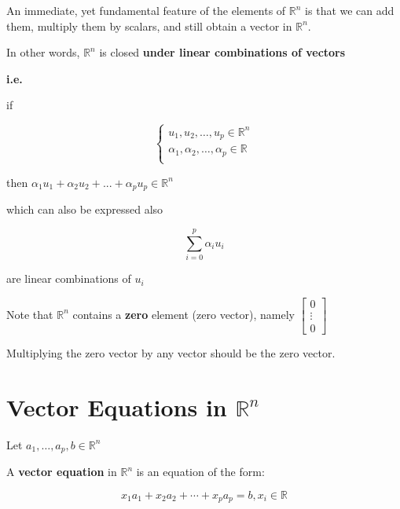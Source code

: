 \begin{remark}
	An immediate, yet fundamental feature of the elements of $\mathbb{R}^n$ is that we can add them, multiply them by scalars, and still obtain a vector in $\mathbb{R}^n$.

	In other words, $\mathbb{R}^n$ is closed \textbf{under linear combinations of vectors}

	\begin{tcolorbox}
		\textbf{i.e.}

		if 
		
		\begin{equation} \label{eq:lc-e}
			\begin{cases}
				u_1, u_2,\ldots, u_p \in \mathbb{R}^n\\
				\alpha_1, \alpha_2,\ldots, \alpha_p \in \mathbb{R}\\
			\end{cases}
		\end{equation}
		
		then $\alpha_1 u_1 + \alpha_2 u_2 + ... + \alpha_p u_p \in \mathbb{R}^n$

		which can also be expressed also

		\begin{equation} \label{eq:lc}
			\sum_{i=0}^{p} \alpha_i u_i
		\end{equation}

		are linear combinations of $u_i$
	\end{tcolorbox}

	Note that $\mathbb{R}^n$ contains a \textbf{zero} element (zero vector), namely $\begin{bmatrix}
		0\\
		\vdots\\
		0
	\end{bmatrix}$

	Multiplying the zero vector by any vector should be the zero vector.
\end{remark}

\section{Vector Equations in $\mathbb{R}^n$}

\begin{definition}
	Let $a_1, \ldots, a_p, b \in \mathbb{R}^n$

	A \textbf{vector equation} in $\mathbb{R}^n$ is an equation of the form:

	\begin{equation} \label{eq:vecEq}
		x_1 a_1 + x_2a_2 + \cdots + x_p a_p = b, x_i \in \mathbb{R}
	\end{equation}
\end{definition}

